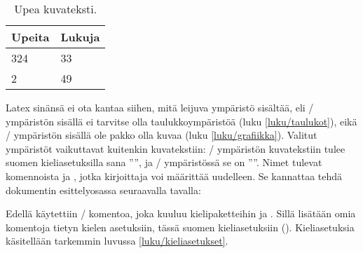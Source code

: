 \begin{esimerkki*}

\begin{koodilohko}
\begin{table}
  \begin{center}
    \renewcommand{\arraystretch}{1.3}
    \begin{tabular}{ll}
      Upeita & Lukuja \\
      \hline
      324 & 33 \\
      2   & 49 \\
      \hline
    \end{tabular}
  \end{center}
  \caption{Upea kuvateksti.}
\end{table}
\end{koodilohko}

  \caption{Leijuvan taulukon toteuttaminen \-/
    ympäristön avulla. Varsinainen taulukko syntyy ympäristön
     avulla}
  \label{esim/leijuosat-perus}
\end{esimerkki*}

Latex sinänsä ei ota kantaa siihen, mitä leijuva ympäristö sisältää, eli
\-/ ympäristön sisällä ei tarvitse olla
taulukkoympäristöä (luku \ref{luku/taulukot}), eikä
\-/ ympäristön sisällä ole pakko olla kuvaa (luku
\ref{luku/grafiikka}). Valitut ympäristöt vaikuttavat kuitenkin
kuvatekstiin: \-/ ympäristön kuvatekstiin tulee suomen
kieliasetuksilla sana ''\tablename'', ja \-/
ympäristössä se on ''\figurename''. Nimet tulevat komennoista
 ja , jotka kirjoittaja voi
määrittää uudelleen. Se kannattaa tehdä dokumentin esittelyosassa
seuraavalla tavalla:

\begin{koodilohkosis}
\addto{\captionsfinnish}{
  \renewcommand{\tablename}{Taulukko}
  \renewcommand{\figurename}{Kuva}
}
\end{koodilohkosis}

Edellä käytettiin \-/ komentoa, joka kuuluu
kielipaketteihin  ja . Sillä
lisätään omia komentoja tietyn kielen asetuksiin, tässä suomen
kieliasetuksiin (). Kieliasetuksia käsitellään
tarkemmin luvussa \ref{luku/kieliasetukset}.

